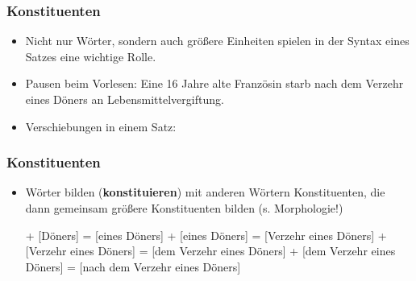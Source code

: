 \begin{frame}
\frametitle{Konstituenten}

\begin{itemize}
	\item Nicht nur Wörter, sondern auch größere Einheiten spielen in der Syntax eines Satzes eine wichtige Rolle.
	\item Pausen beim Vorlesen:
	\ea Eine 16 Jahre alte Französin starb nach dem Verzehr eines Döners an Lebensmittelvergiftung.
	\z
	
\pause	
	\item Verschiebungen in einem Satz:
	\eal 
	\zl


\end{itemize}

\end{frame}


\begin{frame}
\frametitle{Konstituenten}

\begin{itemize}
	\item Wörter bilden (\textbf{konstituieren}) mit anderen Wörtern Konstituenten, die dann gemeinsam größere Konstituenten bilden (s. Morphologie!)
	
	\eal
	\ex [eines] + [Döners] = [eines Döners]
\pause	
	\ex [Verzehr] + [eines Döners] = [Verzehr eines Döners]
\pause
	\ex [dem] + [Verzehr eines Döners] = [dem Verzehr eines Döners]
\pause
	\ex [nach] + [dem Verzehr eines Döners] = [nach dem Verzehr eines Döners]
	\zl

\end{itemize}

\end{frame}


